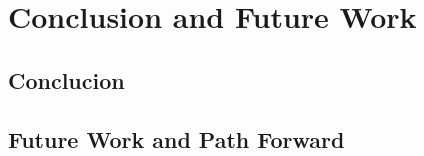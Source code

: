 \chapter{Conclusion and Future Work}
\label{ch:conclusion}

%
%
\section{Conclucion}
\label{sec:conclusion:conclusion}


%
%
\section{Future Work and Path Forward}
\label{sec:conclusion:futureWork}